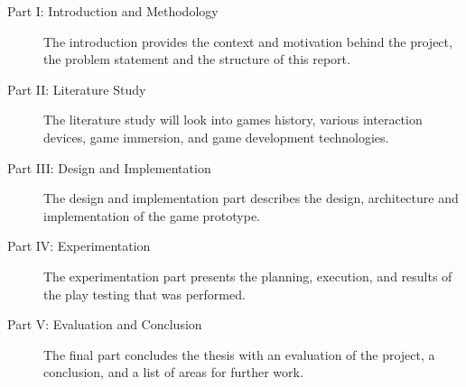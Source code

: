\begin{description}
	\item[Part I: Introduction and Methodology]
	The introduction provides the context and motivation behind the project, the problem statement and the structure of this report.
	
	\item[Part II: Literature Study]
	The literature study will look into games history, various interaction devices, game immersion, and game development technologies.
	
	\item[Part III: Design and Implementation]
	The design and implementation part describes the design, architecture and implementation of the game prototype.
	
	\item[Part IV: Experimentation]
	The experimentation part presents the planning, execution, and results of the play testing that was performed.
	
	\item[Part V: Evaluation and Conclusion]
	The final part concludes the thesis with an evaluation of the project, a conclusion, and a list of areas for further work.
	
\end{description}
